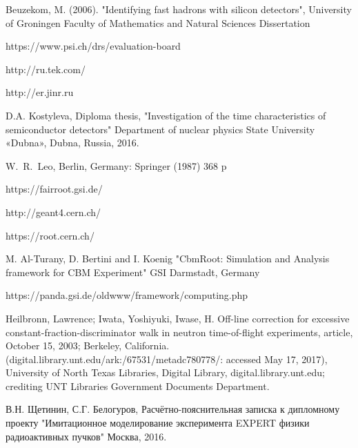 \begin{thebibliography}{999}
	Beuzekom, M. (2006). "Identifying fast hadrons with silicon detectors", University of Groningen Faculty of Mathematics and Natural Sciences Dissertation
	
	https://www.psi.ch/drs/evaluation-board
	
	http://ru.tek.com/
	
	http://er.jinr.ru
	
	D.A. Kostyleva, Diploma thesis,
	"Investigation of the time characteristics of semiconductor detectors"
	Department of nuclear physics
	State University «Dubna», Dubna, Russia, 2016.
	
	W.~R.~Leo,
	Berlin, Germany: Springer (1987) 368 p

	https://fairroot.gsi.de/
	
	http://geant4.cern.ch/

	https://root.cern.ch/

	M. Al-Turany, D. Bertini and I. Koenig
	"CbmRoot: Simulation and Analysis framework for CBM Experiment"
	GSI Darmstadt, Germany
	
	https://panda.gsi.de/oldwww/framework/computing.php

	Heilbronn, Lawrence; Iwata, Yoshiyuki, Iwase, H. Off-line correction for excessive constant-fraction-discriminator walk in neutron time-of-flight experiments, article, October 15, 2003; Berkeley, California. (digital.library.unt.edu/ark:/67531/metadc780778/: accessed May 17, 2017), University of North Texas Libraries, Digital Library, digital.library.unt.edu; crediting UNT Libraries Government Documents Department.
	
	
	В.Н. Щетинин, С.Г. Белогуров,
	Расчётно-пояснительная записка к дипломному проекту
 	"Имитационное моделирование эксперимента EXPERT 
	физики радиоактивных пучков"
	Москва, 2016.
	
\end{thebibliography}
